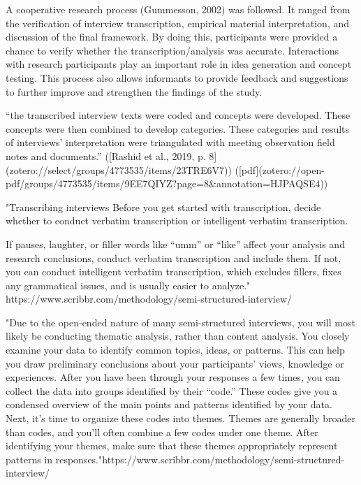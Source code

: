 A cooperative research process (Gummesson, 2002) was followed. It ranged from the verification of interview transcription, empirical material interpretation, and discussion of the final framework. By doing this, participants were provided a chance to verify whether the transcription/analysis was accurate. Interactions with research participants play an important role in idea generation and concept testing. This process also allows informants to provide feedback and suggestions to further improve and strengthen the findings of the study.

“the transcribed interview texts were coded and concepts were developed. These concepts were then combined to develop categories. These categories and results of interviews’ interpretation were triangulated with meeting observation field notes and documents.” ([Rashid et al., 2019, p. 8](zotero://select/groups/4773535/items/23TRE6V7)) ([pdf](zotero://open-pdf/groups/4773535/items/9EE7QIYZ?page=8&annotation=HJPAQSE4))


"Transcribing interviews
Before you get started with transcription, decide whether to conduct verbatim transcription or intelligent verbatim transcription.

If pauses, laughter, or filler words like “umm” or “like” affect your analysis and research conclusions, conduct verbatim transcription and include them.
If not, you can conduct intelligent verbatim transcription, which excludes fillers, fixes any grammatical issues, and is usually easier to analyze." https://www.scribbr.com/methodology/semi-structured-interview/


"Due to the open-ended nature of many semi-structured interviews, you will most likely be conducting thematic analysis, rather than content analysis.
You closely examine your data to identify common topics, ideas, or patterns. This can help you draw preliminary conclusions about your participants’ views, knowledge or experiences.
After you have been through your responses a few times, you can collect the data into groups identified by their “code.” These codes give you a condensed overview of the main points and patterns identified by your data.
Next, it’s time to organize these codes into themes. Themes are generally broader than codes, and you’ll often combine a few codes under one theme. After identifying your themes, make sure that these themes appropriately represent patterns in responses."https://www.scribbr.com/methodology/semi-structured-interview/


